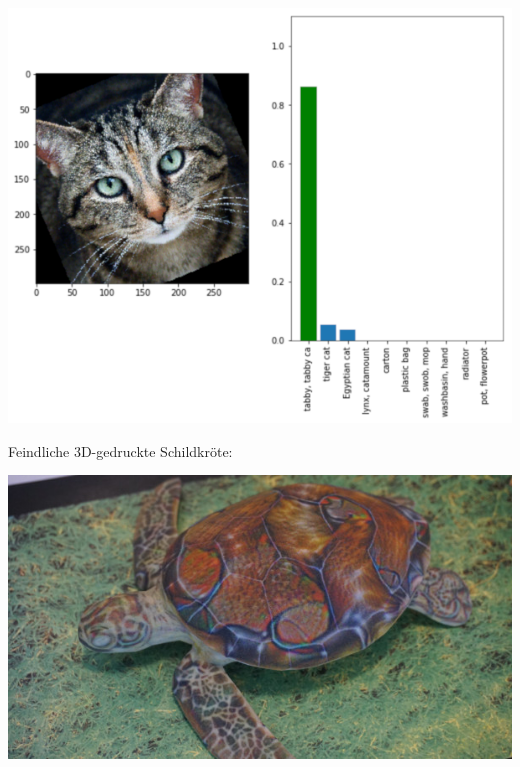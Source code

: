 \documentclass[aspectratio=169,x11names]{beamer}
\begin{document}
\begin{frame}
\begin{center}
\includegraphics[height=0.95\textheight,keepaspectratio]{images/cat_rotated.png} 
\end{center}
\end{frame}

\begin{frame}

\begin{center}
Feindliche 3D-gedruckte Schildkröte:
\end{center}

\begin{center}
\includegraphics[height=0.7\textheight,keepaspectratio]{images/rifle_turtle.jpg} 
\end{center}
\end{frame}
\end{document}
